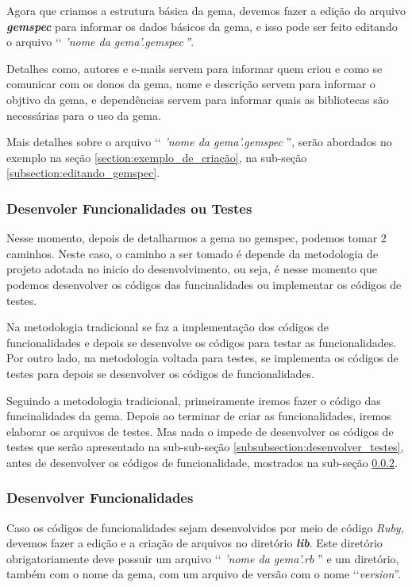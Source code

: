 Agora que criamos a estrutura básica da gema, devemos fazer a edição do arquivo \emph{\textbf{gemspec}}
para informar os dados básicos da gema, e isso pode ser feito editando o arquivo ‘‘ \emph{'nome da gema'.gemspec }''.

Detalhes como, autores e e-mails servem para informar quem criou e como se comunicar com os donos da gema,
nome e descrição servem para informar o objtivo da gema, e dependências servem para informar quais as bibliotecas
são necessárias para o uso da gema.

Mais detalhes sobre o arquivo ‘‘ \emph{'nome da gema'.gemspec }'', serão abordados no exemplo na seção
\ref{section:exemplo_de_criação}, na sub-seção \ref{subsection:editando_gemspec}.


\subsubsection{Desenvoler Funcionalidades ou Testes}
\label{subsubsection:desenvolver_funcionalidades_ou_testes}


Nesse momento, depois de detalharmos a gema no gemspec, podemos tomar 2 caminhos. Neste caso, o caminho a ser
tomado é depende da metodologia de projeto adotada no inicio do desenvolvimento, ou seja, é nesse
momento que podemos desenvolver os códigos das funcinalidades ou implementar os códigos de testes.

Na metodologia tradicional se faz a implementação dos códigos de funcionalidades e depois se
desenvolve os códigos para testar as funcionalidades. Por outro lado, na metodologia voltada para
testes, se implementa os códigos de testes para depois se desenvolver os códigos de funcionalidades.

Seguindo a metodologia tradicional, primeiramente iremos fazer o código das funcinalidades da gema.
Depois ao terminar de criar as funcionalidades, iremos elaborar os arquivos de testes. Mas nada o impede
de desenvolver os códigos de testes que serão apresentado na sub-sub-seção \ref{subsubsection:desenvolver_testes},
antes de desenvolver os códigos de funcionalidade, mostrados na sub-seção
\ref{subsubsection:desenvolver_funcionalidades}.


\subsubsection{Desenvolver Funcionalidades}
\label{subsubsection:desenvolver_funcionalidades}


Caso os códigos de funcionalidades sejam desenvolvidos por meio de código \emph{Ruby}, devemos fazer a
edição e a criação de arquivos no diretório \emph{\textbf{lib}}. Este diretório obrigatoriamente deve
possuir um arquivo ‘‘ \emph{'nome da gema'.rb }'' e um diretório, também com o nome da gema, com um arquivo
de versão com o nome ‘‘\emph{version}''. 

